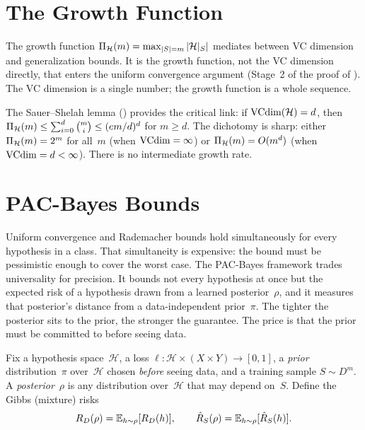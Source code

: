 
\section{The Growth Function}
\label{sec:growth-function}

The growth function $\Pi_\mathcal{H}(m) = \max_{|S|=m}
|\mathcal{H}|_S|$ mediates between VC dimension and generalization bounds.
It is the growth function, not the VC dimension directly, that enters
the uniform convergence argument (Stage~2 of the proof of
).  The VC dimension is a single number; the growth
function is a whole sequence.

The Sauer--Shelah lemma () provides the critical
link: if $\mathrm{VCdim}(\mathcal{H}) = d$, then
$\Pi_\mathcal{H}(m) \leq \sum_{i=0}^d \binom{m}{i}
\leq (em/d)^d$ for $m \geq d$.
The dichotomy is sharp: either $\Pi_\mathcal{H}(m) = 2^m$ for all~$m$
(when $\mathrm{VCdim} = \infty$) or $\Pi_\mathcal{H}(m) = O(m^d)$
(when $\mathrm{VCdim} = d < \infty$).  There is no intermediate growth rate.



\section{PAC-Bayes Bounds}
\label{sec:pac-bayes}

Uniform convergence and Rademacher bounds hold simultaneously for every hypothesis in a class. That simultaneity is expensive: the bound must be pessimistic enough to cover the worst case. The PAC-Bayes framework trades universality for precision. It bounds not every hypothesis at once but the expected risk of a hypothesis drawn from a learned posterior~$\rho$, and it measures that posterior's distance from a data-independent prior~$\pi$. The tighter the posterior sits to the prior, the stronger the guarantee. The price is that the prior must be committed to before seeing data.

\begin{defn}
\label{def:pac-bayes-setting}
Fix a hypothesis space~$\mathcal{H}$, a loss
$\ell \colon \mathcal{H} \times (X \times Y) \to [0,1]$,
a \emph{prior} distribution~$\pi$ over~$\mathcal{H}$ chosen
\emph{before} seeing data, and a training sample $S \sim D^m$.
A \emph{posterior}~$\rho$ is any distribution over~$\mathcal{H}$ that
may depend on~$S$.  Define the Gibbs (mixture)
risks
\[
  R_D(\rho) = \mathbb{E}_{h \sim \rho}[R_D(h)], \qquad
  \hat{R}_S(\rho) = \mathbb{E}_{h \sim \rho}[\hat{R}_S(h)].
\]
\end{defn}


